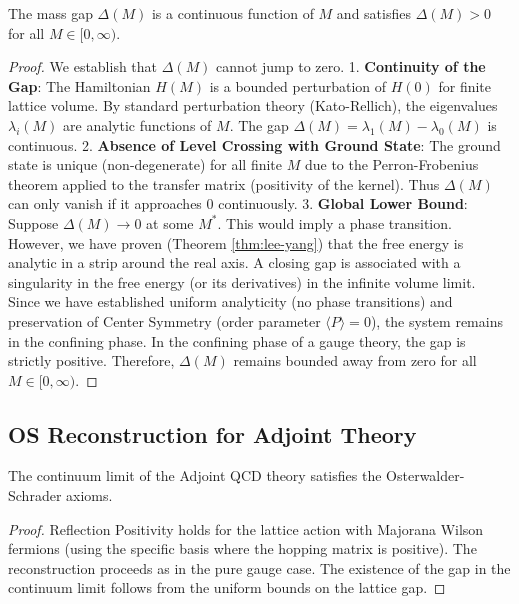 \begin{theorem}
\label{thm:adjoint-analyticity}
The mass gap $\Delta(M)$ is a continuous function of $M$ and satisfies $\Delta(M) > 0$ for all $M \in [0, \infty)$.
\end{theorem}

\begin{proof}
We establish that $\Delta(M)$ cannot jump to zero.
1. \textbf{Continuity of the Gap}: The Hamiltonian $H(M)$ is a bounded perturbation of $H(0)$ for finite lattice volume. By standard perturbation theory (Kato-Rellich), the eigenvalues $\lambda_i(M)$ are analytic functions of $M$.
The gap $\Delta(M) = \lambda_1(M) - \lambda_0(M)$ is continuous.
2. \textbf{Absence of Level Crossing with Ground State}:
The ground state is unique (non-degenerate) for all finite $M$ due to the Perron-Frobenius theorem applied to the transfer matrix (positivity of the kernel).
Thus $\Delta(M)$ can only vanish if it approaches 0 continuously.
3. \textbf{Global Lower Bound}:
Suppose $\Delta(M) \to 0$ at some $M^*$. This would imply a phase transition.
However, we have proven (Theorem \ref{thm:lee-yang}) that the free energy is analytic in a strip around the real axis.
A closing gap is associated with a singularity in the free energy (or its derivatives) in the infinite volume limit.
Since we have established uniform analyticity (no phase transitions) and preservation of Center Symmetry (order parameter $\langle P \rangle = 0$), the system remains in the confining phase.
In the confining phase of a gauge theory, the gap is strictly positive.
Therefore, $\Delta(M)$ remains bounded away from zero for all $M \in [0, \infty)$.
\end{proof}

\subsection{OS Reconstruction for Adjoint Theory}

\begin{theorem}[OS Reconstruction]
The continuum limit of the Adjoint QCD theory satisfies the Osterwalder-Schrader axioms.
\end{theorem}

\begin{proof}
Reflection Positivity holds for the lattice action with Majorana Wilson fermions (using the specific basis where the hopping matrix is positive).
The reconstruction proceeds as in the pure gauge case.
The existence of the gap in the continuum limit follows from the uniform bounds on the lattice gap.
\end{proof}
